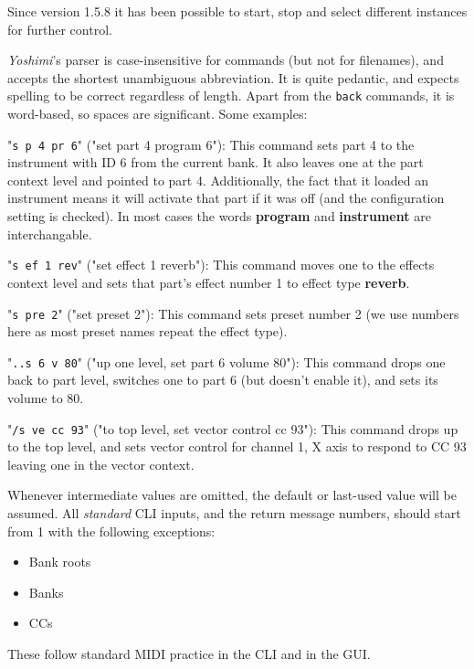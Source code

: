 \documentclass[
 11pt,
 twoside,
 a4paper,
 final                                 %
]{article}
\begin{document}
   Since version 1.5.8 it has been possible to start, stop and select
   different instances for further control.

   \textsl{Yoshimi}'s parser is case-insensitive for commands (but not for
   filenames), and accepts the shortest unambiguous abbreviation. It is
   quite pedantic, and expects spelling to be correct regardless of length.
   Apart from the \texttt{back} commands, it is word-based, so spaces are
   significant.  Some examples:

   "\texttt{s p 4 pr 6}" ("set part 4 program 6"):
   This command sets part 4 to the instrument with ID 6 from the current bank.
   It also leaves one at the part context level and pointed to part 4.
   Additionally, the fact that it loaded an instrument means it will activate
   that part if it was off (and the configuration setting is checked). In most
   cases the words \textbf{program} and \textbf{instrument} are interchangable.

   "\texttt{s ef 1 rev}" ("set effect 1 reverb"):
   This command moves one to the effects context level and sets that part's
   effect number 1 to effect type \textbf{reverb}.

   "\texttt{s pre 2}" ("set preset 2"):
   This command sets preset number 2 (we use numbers here as most preset names
   repeat the effect type).

   "\texttt{..s 6 v 80}" ("up one level, set part 6 volume 80"):
   This command drops one back to part level, switches one to part 6 (but doesn't
   enable it), and sets its volume to 80.

   "\texttt{/s ve cc 93}" ("to top level, set vector control cc 93"):
   This command drops up to the top level, and sets vector control for
   channel 1, X axis to respond to CC 93 leaving one in the vector context.

   Whenever intermediate values are omitted, the default or last-used value
   will be assumed.
   All \textsl{standard} CLI inputs, and the return message numbers,
   should start from 1 with the following exceptions:

    \begin{itemize}
       \item Bank roots
       \item Banks
       \item CCs
       \end{itemize}

   These follow standard MIDI practice in the CLI and in the GUI.
\end{document}
